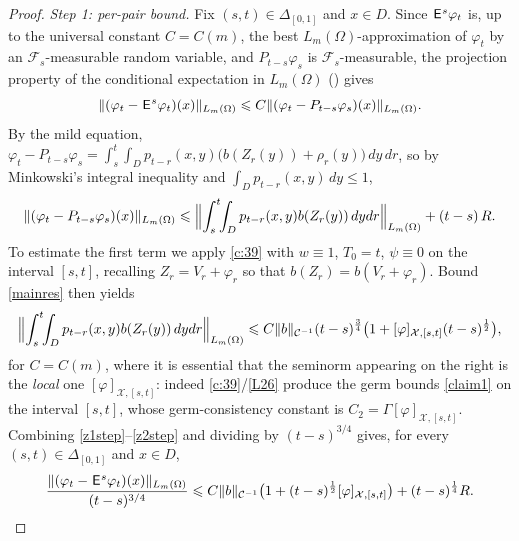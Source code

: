 \documentclass[12pt]{article}
\theoremstyle{definition}
\DeclareMathOperator{\1}{\mathbbm{1}}%
\def\E{\hskip.15ex\mathsf{E}\hskip.10ex}
\def\phi{\varphi}
\renewcommand{\le}{\leqslant}
\newcommand{\C}{\mathcal{C}}
\newcommand{\F}{\mathcal{F}}
\newcommand{\X}{\mathcal{X}}
\begin{document}
\begin{proof}
\smallskip
\emph{Step 1: per-pair bound.}
Fix $(s,t)\in\Delta_{[0,1]}$ and $x\in D$. Since $\E^s\phi_t$ is, up to the universal
constant $C=C(m)$, the best $L_m(\Omega)$-approximation of $\phi_t$ by an
$\F_s$-measurable random variable, and $P_{t-s}\phi_s$ is $\F_s$-measurable, the
projection property of the conditional expectation in $L_m(\Omega)$
(\cite[Lemma~4.2(i)]{BDGLevy}) gives
\begin{equation}\label{z1step} 	
\|(\phi_t-\E^s \phi_t)(x)\|_{L_m(\Omega)}\le C \|(\phi_t-P_{t-s}\phi_s)(x)\|_{L_m(\Omega)} .
\end{equation}
By the mild equation, $\phi_t-P_{t-s}\phi_s=\int_s^t\int_D p_{t-r}(x,y)\bigl(b(Z_r(y))+\rho_r(y)\bigr)\,dy\,dr$,
so by Minkowski's integral inequality and $\int_Dp_{t-r}(x,y)\,dy\le1$,
\begin{equation}\label{z1bis}
\|(\phi_t-P_{t-s}\phi_s)(x)\|_{L_m(\Omega)}
\le \Bigl\|\int_s^t\!\!\int_D p_{t-r}(x,y) b(Z_r(y))\,dydr\Bigr\|_{L_m(\Omega)}+(t-s)\,R .
\end{equation}
To estimate the first term we apply \cref{c:39} with $w\equiv1$, $T_0=t$, $\psi\equiv0$
on the interval $[s,t]$, recalling $Z_r=V_r+\phi_r$ so that $b(Z_r)=b(V_r+\phi_r)$.
Bound \eqref{mainres} then yields
\begin{equation}\label{z2step}
\Bigl\|\int_s^t\!\!\int_D p_{t-r}(x,y) b(Z_r(y))\,dydr\Bigr\|_{L_m(\Omega)}
\le C \|b\|_{\C^{-1}} (t-s)^{\frac34}\bigl(1+[\phi]_{\X,[s,t]}(t-s)^{\frac12}\bigr),
\end{equation}
for $C=C(m)$, where it is essential that the seminorm appearing on the right is the
\emph{local} one $[\phi]_{\X,[s,t]}$: indeed \cref{c:39}/\cref{L26} produce the germ
bounds \eqref{claim1} on the interval $[s,t]$, whose germ-consistency constant is
$C_2=\Gamma[\phi]_{\X,[s,t]}$. Combining \eqref{z1step}--\eqref{z2step} and dividing by
$(t-s)^{3/4}$ gives, for every $(s,t)\in\Delta_{[0,1]}$ and $x\in D$,
\begin{equation}\label{perpair}
\frac{\|(\phi_t-\E^s\phi_t)(x)\|_{L_m(\Omega)}}{(t-s)^{3/4}}
\le C\|b\|_{\C^{-1}}\bigl(1+(t-s)^{\frac12}[\phi]_{\X,[s,t]}\bigr)+(t-s)^{\frac14}R .
\end{equation}


\end{proof}
\end{document}
